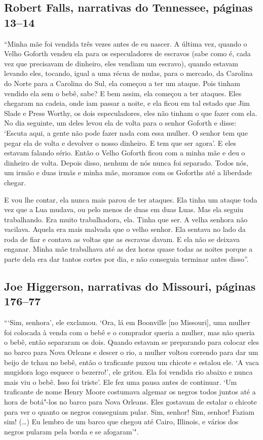 \subsection{Robert Falls, narrativas do Tennessee, páginas 13--14} \label{ref87}

``Minha mãe foi vendida três vezes antes de eu nascer. A última vez,
quando o Velho Goforth vendeu ela para os especuladores de escravos
(sabe como é, cada vez que precisavam de dinheiro, eles vendiam um
escravo), quando estavam levando eles, tocando, igual a uma récua de
mulas, para o mercado, da Carolina do Norte para a Carolina do Sul, ela
começou a ter um ataque. Pois tinham vendido ela sem o bebê, sabe? E bem
assim, ela começou a ter ataques. Eles chegaram na cadeia, onde iam
passar a noite, e ela ficou em tal estado que Jim Slade e Press Worthy,
os dois especuladores, eles não tinham o que fazer com ela. No dia
seguinte, um deles levou ela de volta para o senhor Goforth e disse:
`Escuta aqui, a gente não pode fazer nada com essa mulher. O senhor tem
que pegar ela de volta e devolver o nosso dinheiro. E tem que ser
agora'. E eles estavam falando sério. Então o Velho Goforth ficou com a
minha mãe e deu o dinheiro de volta. Depois disso, nenhum de nós nunca
foi separado. Todos nós, um irmão e duas irmãs e minha mãe, moramos com
os Goforths até a liberdade chegar.

E vou lhe contar, ela nunca mais parou de ter ataques. Ela tinha um
ataque toda vez que a Lua mudava, ou pelo menos de duas em duas Luas.
Mas ela seguiu trabalhando. Era muito trabalhadora, ela. Tinha que ser.
A velha senhora não vacilava. Aquela era mais malvada que o velho
senhor. Ela sentava no lado da roda de fiar e contava as voltas que as
escravas davam. E ela não se deixava enganar. Minha mãe trabalhava até
as dez horas quase todas as noites porque a parte dela era dar tantos
cortes por dia, e não conseguia terminar antes disso''.

\subsection{Joe Higgerson, narrativas do Missouri, páginas 176--77}
\label{ref143}

```Sim, senhora', ele exclamou. `Ora, lá em Boonville {[}no Missouri{]},
uma mulher foi colocada à venda com o bebê e o comprador queria a
mulher, mas não queria o bebê, então separaram os dois. Quando estavam
se preparando para colocar eles no barco para Nova Orleans e descer o
rio, a mulher voltou correndo para dar um beijo de tchau no bebê, então
o traficante puxou um chicote e estalou ele. `A vaca mugidora logo
esquece o bezerro!', ele gritou. Ela foi vendida rio abaixo e nunca
mais viu o bebê. Isso foi triste'. Ele fez uma pausa antes de continuar.
`Um traficante de nome Henry Moore costumava algemar os negros todos
juntos até a hora de botá"-los no barco para Nova Orleans. Eles gostavam
de estalar o chicote para ver o quanto os negros conseguiam pular. Sim,
senhor! Sim, senhor! Faziam sim! (\ldots{}) Eu lembro de um barco que
chegou até Cairo, Illinois, e vários dos negros pularam pela borda e se
afogaram'".

